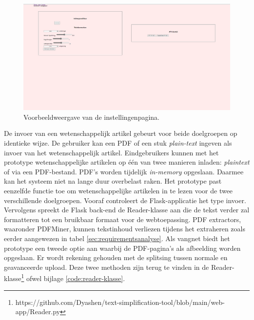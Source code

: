 \begin{center}
	\begin{figure}[H]
		\includegraphics[width=\linewidth]{img/website-instellingen.png}
		\caption{Voorbeeldweergave van de instellingenpagina.}
		\label{img:website-instellingen}
	\end{figure}
\end{center}

De invoer van een wetenschappelijk artikel gebeurt voor beide doelgroepen op identieke wijze. De gebruiker kan een PDF of een stuk \textit{plain-text} ingeven als invoer van het wetenschappelijk artikel. Eindgebruikers kunnen met het prototype wetenschappelijke artikelen op één van twee manieren inladen: \textit{plaintext} of via een PDF-bestand. PDF's worden tijdelijk \textit{in-memory} opgeslaan. Daarmee kan het systeem niet na lange duur overbelast raken. Het prototype past eenzelfde functie toe om wetenschappelijke artikelen in te lezen voor de twee verschillende doelgroepen. Vooraf controleert de Flask-applicatie het type invoer. Vervolgens spreekt de Flask back-end de Reader-klasse aan die de tekst verder zal formatteren tot een bruikbaar formaat voor de webtoepassing. PDF extractors, waaronder PDFMiner, kunnen tekstinhoud verliezen tijdens het extraheren zoals eerder aangewezen in tabel \ref{sec:requirementsanalyse}. Als vangnet biedt het prototype een tweede optie aan waarbij de PDF-pagina's als afbeelding worden opgeslaan. Er wordt rekening gehouden met de splitsing tussen normale en geavanceerde upload. Deze twee methoden zijn terug te vinden in de Reader-klasse\footnote{https://github.com/Dyashen/text-simplification-tool/blob/main/web-app/Reader.py} ofwel bijlage \ref{code:reader-klasse}.

